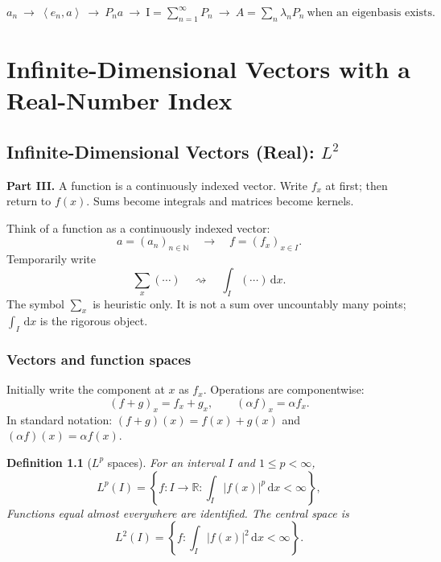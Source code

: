 \documentclass[11pt,a5paper,oneside,openany]{scrreprt}
\theoremstyle{notes}
\theoremstyle{definitions}
\newtheorem{definition}[theorem]{Definition}
\newcommand{\R}{\mathbb{R}}
\newcommand{\N}{\mathbb{N}}
\newcommand{\ip}[2]{\left\langle #1,#2\right\rangle}
\newcommand{\Id}{\mathrm{I}}
\newcommand{\dd}{\,\mathrm{d}}
\begin{document}
\begin{summarybox}
\centering
$\displaystyle
a_n\ \longrightarrow\ \ip{e_n}{a}\ \longrightarrow\ P_na
\ \longrightarrow\
\Id=\sum_{n=1}^{\infty}P_n
\ \longrightarrow\
A=\sum_n\lambda_nP_n\ \text{when an eigenbasis exists}.$
\end{summarybox}

\part{Infinite-Dimensional Vectors with a Real-Number Index}
\chapter{Infinite-Dimensional Vectors (Real): $L^2$}
\label{part:functions}

\begin{summarybox}
\textbf{Part III.}  A function is a continuously indexed vector.  Write $f_x$
at first; then return to $f(x)$.  Sums become integrals and matrices become
kernels.
\end{summarybox}

\begin{bridge}
Think of a function as a continuously indexed vector:
\[
  a=(a_n)_{n\in\N}
  \quad\longrightarrow\quad
  f=(f_x)_{x\in I}.
\]
Temporarily write
\[
  \sum_x(\cdots)\quad\rightsquigarrow\quad\int_I(\cdots)\dd x.
\]
The symbol $\sum_x$ is heuristic only.  It is not a sum over uncountably many
points; $\int_I\dd x$ is the rigorous object.
\end{bridge}

\section{Vectors and function spaces}

Initially write the component at $x$ as $f_x$.  Operations are componentwise:
\[
 (f+g)_x=f_x+g_x,
 \qquad
 (\alpha f)_x=\alpha f_x.
\]
In standard notation:
$ (f+g)(x)=f(x)+g(x)$ and $(\alpha f)(x)=\alpha f(x)$.

\begin{definition}[$L^p$ spaces]
For an interval $I$ and $1\le p<\infty$,
\[
 L^p(I)=\left\{f:I\to\R:\int_I|f(x)|^p\dd x<\infty\right\},
\]
Functions equal almost everywhere are identified.  The central space is
\[
 \boxed{L^2(I)=\left\{f:\int_I|f(x)|^2\dd x<\infty\right\}}.
\]
\end{definition}
\end{document}
